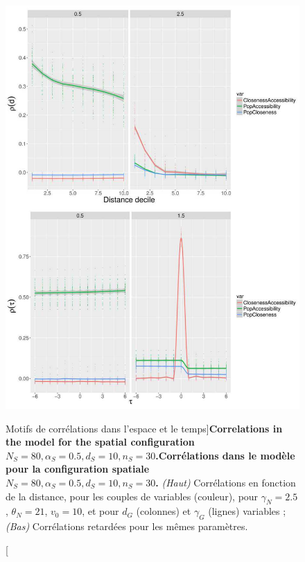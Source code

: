 \begin{figure}
\includegraphics[width=\linewidth,height=0.9\textheight]{Figures/Final/6-1-3-fig-macrocoevolexplo-correlations.jpg}
	\caption[Correlations][Motifs de corrélations dans l'espace et le temps]{\textbf{Correlations in the model for the spatial configuration $N_S=80,\alpha_S=0.5,d_S=10,n_S=30$.}\label{fig:macrocoevolexplo:correlations}}{\textbf{Corrélations dans le modèle pour la configuration spatiale $N_S=80,\alpha_S=0.5,d_S=10,n_S=30$.} \textit{(Haut)} Corrélations en fonction de la distance, pour les couples de variables (couleur), pour $\gamma_N = 2.5$, $\theta_N = 21$, $v_0 = 10$, et pour $d_G$ (colonnes) et $\gamma_G$ (lignes) variables ; \textit{(Bas)} Corrélations retardées pour les mêmes paramètres.\label{fig:macrocoevolexplo:correlations}}
\end{figure}


